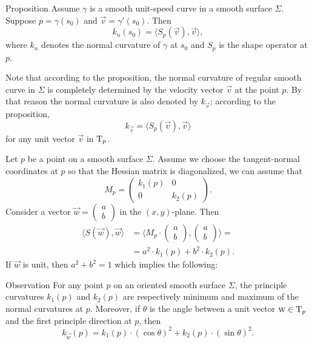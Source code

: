 \begin{thm}{Proposition}\label{prop:normal-shape}
Assume $\gamma$ is a smooth unit-speed curve in a smooth surface $\Sigma$.
Suppose $p=\gamma(s_0)$ and $\vec v=\gamma'(s_0)$.
Then 
\[k_n(s_0)=\langle S_p(\vec v),\vec v\rangle,\]
where $k_n$ denotes the normal curvature of $\gamma$ at $s_0$ and $S_p$ is the shape operator at $p$.
\end{thm}

Note that according to the proposition, the normal curvature of regular smooth curve in $\Sigma$ is completely determined by the velocity vector $\vec v$ at the point $p$.
By that reason the normal curvature is also denoted by $k_{\vec v}$;
according to the proposition,
\[k_{\vec v}=\langle S_p(\vec v),\vec v\rangle\]
for any unit vector $\vec v$ in $\mathrm{T}_p$.

Let $p$ be a point on a smooth surface $\Sigma$.
Assume we choose the tangent-normal coordinates at $p$ so that the Hessian matrix is diagonalized, we can assume that
\[M_p=\begin{pmatrix}
   k_1(p)
   &0
   \\
   0
   &k_2(p)
  \end{pmatrix}.
\]
Consider a vector ${\vec w}=(\begin{smallmatrix}a\\b
\end{smallmatrix})$ in the $(x,y)$-plane.
Then
\begin{align*}
\langle S(\vec w),\vec w\rangle
&=\langle M_p\cdot(\begin{smallmatrix}a\\b
\end{smallmatrix}),(\begin{smallmatrix}a\\b
\end{smallmatrix})\rangle=
\\
&=a^2\cdot k_1(p) +b^2\cdot k_2(p). 
\end{align*}
If ${\vec w}$ is unit, then $a^2+b^2=1$ which implies the following:

\begin{thm}{Observation}\label{obs:k1-k2}
For any point $p$ on an oriented smooth surface $\Sigma$,
the principle curvatures $k_1(p)$ and $k_2(p)$ are respectively minimum and maximum of the normal curvatures at $p$.
Moreover, if $\theta$ is the angle between a unit vector ${\textsc w}\in\mathrm{T}_p$ and the first principle direction at $p$, then 
\[k_{\vec w}(p)=k_1(p)\cdot(\cos\theta)^2+k_2(p)\cdot(\sin\theta)^2.\]

\end{thm}

